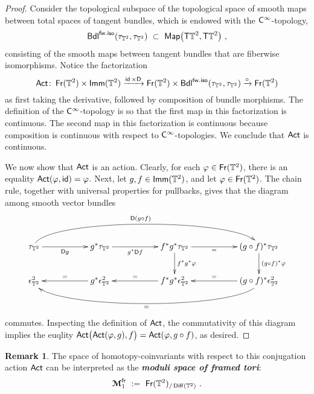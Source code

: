 \documentclass{amsart}
\theoremstyle{definition}
\newtheorem{remark}[theorem]{Remark}
\theoremstyle{remark}
\DeclareMathOperator{\Map}{{\sf Map}}
\newcommand{\bit}[1]{\textbf{\textit{#1}}}
\newcommand{\lacts}{\curvearrowright}
\DeclareMathOperator{\Diff}{{\sf Diff}}
\DeclareMathOperator{\fr}{\sf fr}
\newcommand{\xra}{\xrightarrow}
\def\bcM{\boldsymbol{\mathcal M}}\def\bcN{\boldsymbol{\mathcal N}}\def\bcO{\boldsymbol{\mathcal O}}\def\bcP{\boldsymbol{\mathcal P}}\def\bcQ{\boldsymbol{\mathcal Q}}\def\bcR{\boldsymbol{\mathcal R}}
\def\bcM{\boldsymbol{\mathcal M}}
\DeclareMathOperator{\Fr}{\sf Fr}
\DeclareMathOperator{\id}{\sf id}
\DeclareMathOperator{\Act}{\sf Act}
\DeclareMathOperator{\Imm}{\sf Imm}
\begin{document}
\begin{proof}
Consider the topological subspace of the topological space of smooth maps between total spaces of tangent bundles, which is endowed with the $\mathsf C^\infty$-topology,
\[
{\sf Bdl}^{\sf fw.iso}(\tau_{\TT^2} , \tau_{\TT^2})
~\subset~
\Map\bigl( \sT \TT^2 , \sT \TT^2 \bigr)
~,
\]
consisting of the smooth maps between tangent bundles that are fiberwise isomorphisms.
Notice the factorization
\[
\Act\colon
\Fr(\TT^2)
\times
\Imm(\TT^2)
\xra{\id \times \sD}
\Fr(\TT^2)
\times 
{\sf Bdl}^{\sf fw.iso}(\tau_{\TT^2} , \tau_{\TT^2})
\xra{\circ}
\Fr(\TT^2)
\]
as first taking the derivative, followed by composition of bundle morphisms.  
The definition of the $\mathsf C^\infty$-topology is so that the first map in this factorization is continuous. 
The second map in this factorization is continuous because composition is continuous with respect to $\mathsf C^\infty$-topologies.
We conclude that $\Act$ is continuous.  

We now show that $\Act$ is an action.
Clearly, for each $\varphi \in \Fr(\TT^2)$, there is an equality $\Act( \varphi  , \id) = \varphi$.
Next, let $g,f\in \Imm(\TT^2)$, and let $\varphi \in \Fr(\TT^2)$.
The chain rule, together with universal properties for pullbacks, gives that the diagram among smooth vector bundles
\[
\xymatrix{
\tau_{\TT^2}
\ar@(u,u)[rrrrrr]^-{\sD (g\circ f)}
\ar[rr]_-{\sD g}
&&
g^\ast 
\tau_{\TT^2}
\ar[rr]_-{g^\ast \sD f}
&&
f^\ast g^\ast \tau_{\TT^2}
\ar[d]^-{f^\ast g^\ast \varphi}
\ar[rr]_-=
&&
(g\circ f)^\ast \tau_{\TT^2}
\ar[d]^-{(g \circ f)^\ast \varphi}
\\
\epsilon^2_{\TT^2}
&&
g^\ast \epsilon^2_{\TT^2}
\ar[ll]_-=
&&
f^\ast g^\ast \epsilon^2_{\TT^2}
\ar[ll]_-=
&&
(g \circ f)^\ast \epsilon^2_{\TT^2}
\ar[ll]_-=
\ar@(d,d)[llllll]^=
}
\]
commutes.
Inspecting the definition of $\Act$, the commutativity of this diagram implies the euqlity $\Act\bigl( \Act(\varphi, g) , f \bigr) = \Act( \varphi , g\circ f)$, as desired.  



\end{proof}




\begin{remark}
\label{r8}
The space of homotopy-coinvariants with respect to this conjugation action $\Act$ can be interpreted as the \bit{moduli space of framed tori}:
\[
\bcM^{\fr}_1
~:=~
\Fr(\TT^2)_{/ \Diff(\TT^2)}
~.
\]


\end{remark}
\end{document}
